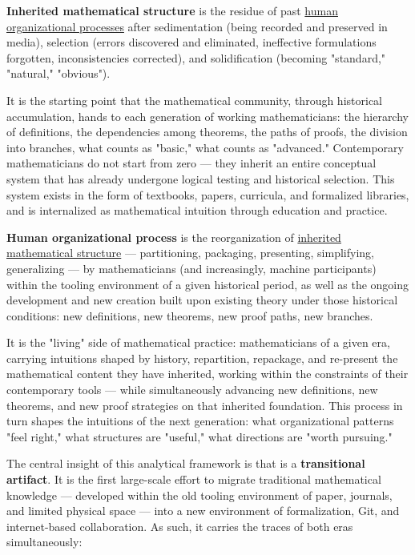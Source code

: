 \begin{finding}
    \textbf{Inherited mathematical structure} is the residue of past \underline{human organizational processes} after sedimentation (being recorded and preserved in media), selection (errors discovered and eliminated, ineffective formulations forgotten, inconsistencies corrected), and solidification (becoming "standard," "natural," "obvious").

    It is the starting point that the mathematical community, through historical accumulation, hands to each generation of working mathematicians: the hierarchy of definitions, the dependencies among theorems, the paths of proofs, the division into branches, what counts as "basic," what counts as "advanced." Contemporary mathematicians do not start from zero — they inherit an entire conceptual system that has already undergone logical testing and historical selection. This system exists in the form of textbooks, papers, curricula, and formalized libraries, and is internalized as mathematical intuition through education and practice.
\end{finding}
\begin{finding}
    \textbf{Human organizational process} is the reorganization of \underline{inherited mathematical structure} — partitioning, packaging, presenting, simplifying, generalizing — by mathematicians (and increasingly, machine participants) within the tooling environment of a given historical period, as well as the ongoing development and new creation built upon existing theory under those historical conditions: new definitions, new theorems, new proof paths, new branches.
    
    It is the "living" side of mathematical practice: mathematicians of a given era, carrying intuitions shaped by history, repartition, repackage, and re-present the mathematical content they have inherited, working within the constraints of their contemporary tools — while simultaneously advancing new definitions, new theorems, and new proof strategies on that inherited foundation. This process in turn shapes the intuitions of the next generation: what organizational patterns "feel right," what structures are "useful," what directions are "worth pursuing."
\end{finding}

The central insight of this analytical framework is that  is a \textbf{transitional artifact}. It is the first large-scale effort to migrate traditional mathematical knowledge — developed within the old tooling environment of paper, journals, and limited physical space — into a new environment of formalization, Git, and internet-based collaboration. As such, it carries the traces of both eras simultaneously:

